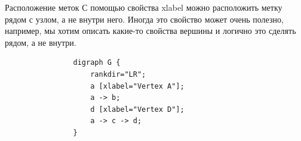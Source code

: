\documentclass{beamer}
\begin{document}
\begin{frame}[fragile]{Расположение меток}
	С помощью свойства \color{red}xlabel \color{black}можно расположить метку рядом с узлом, а не внутри него. Иногда это свойство может очень полезно, например, мы хотим описать какие-то свойства вершины и логично это сделять рядом, а не внутри.
	\newline
	\newline
	\begin{minipage}{0.5\textwidth}
		\begin{verbatim}
				digraph G {
					rankdir="LR";
					a [xlabel="Vertex A"];
					a -> b;
					d [xlabel="Vertex D"];
					a -> c -> d;
				}
		\end{verbatim}
	\end{minipage}
	\hfill
	\begin{minipage}{0.45\textwidth}
	\end{minipage}
\end{frame}
\end{document}
